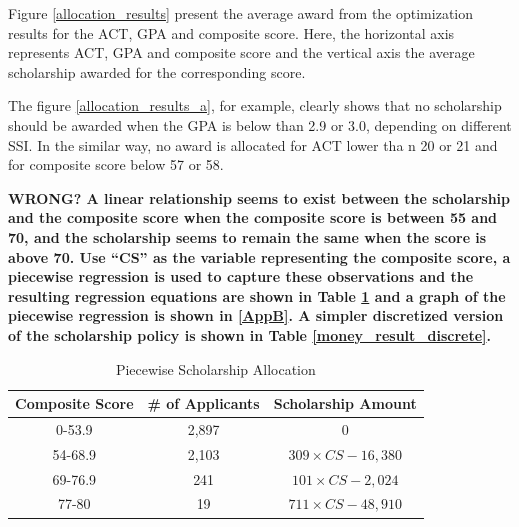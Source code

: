 \documentclass[12pt,english]{report}
\begin{document}
Figure \ref{allocation_results} present the average award from the
optimization results for the ACT, GPA and composite score. Here, the
horizontal axis represents ACT, GPA and composite score and the vertical axis
the average scholarship awarded for the corresponding score.

%

The figure \ref{allocation_results_a}, for example, clearly shows that
no scholarship should be awarded when the GPA is below than 2.9 or 3.0,
depending
on different SSI. In the similar way, no award is allocated for ACT lower tha
n 20 or 21 and for composite score below 57 or 58.

\textbf{
WRONG?
A linear relationship seems to exist between the scholarship and the
composite score when the composite score is between 55 and 70, and the
scholarship seems to remain the same when the score is above 70.
Use ``CS'' as the variable representing the composite score, a piecewise
regression is used to capture these observations and the resulting regression
equations are shown in Table \ref{money_result} and a graph of the piecewise
regression is shown in \ref{AppB}. A simpler discretized version of the
scholarship policy is shown in Table \ref{money_result_discrete}. }

\begin{table}[ht]
\centering
\begin{tabular}{|c|c|c|}
\hline
Composite Score & \# of Applicants & Scholarship Amount \\ \hline
0-53.9         & 2,897	&0              \\ \hline
54-68.9        & 2,103  &$309\times CS -16,380 $            \\ \hline
69-76.9        &  241 &  $101\times CS - 2,024$           \\ \hline
77-80       & 19 &   $711 \times CS -48,910$          \\ \hline
\end{tabular}
\caption{Piecewise Scholarship Allocation}
\label{money_result}
\end{table}
\end{document}
